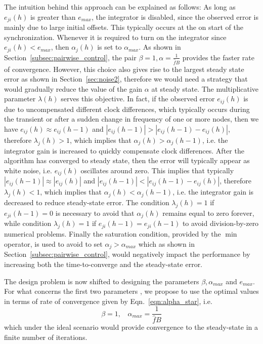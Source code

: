 \documentclass[english,a4paper,10pt,final]{article}
\numberwithin{equation}{section}
\numberwithin{figure}{section}
\begin{document}
The intuition behind this approach can be explained as follows: As long as $e_{ji}(h)$ is greater than $e_{max}$, the integrator is disabled, since the observed error is mainly due to large initial offsets. This typically occurs at the on start of the synchronization. Whenever it is required to turn on the integrator since $e_{ji}(h)<e_{max}$, then $\alpha_j(h)$ is set to $\alpha_{max}$. As shown in Section~\ref{subsec:pairwise_control}, the pair $\beta=1, \alpha=\frac{1}{\hat f B}$ provides the faster rate of convergence. However, this choice also gives rise to the largest steady state error as shown in Section~\ref{sec:noise2}, therefore we would need a strategy that would gradually reduce the value of the gain $\alpha$ at steady state. The multiplicative parameter $\lambda(h)$ serves this objective. In fact, if the observed error $e_{ij}(h)$ is due to uncompensated different clock differences, which typically occurs during the transient or after a sudden change in frequency of one or more nodes, then we have $ e_{ij}(h)\approx e_{ij}(h-1)$ and $|e_{ij}(h-1)|> |e_{ij}(h-1)-e_{ij}(h)|$, therefore $\lambda_j(h)>1$, which implies that $\alpha_j(h)>\alpha_j(h-1)$, i.e. the integrator gain is increased to quickly compensate clock differences. After the algorithm has converged to steady state, then the error will typically appear as white noise, i.e. $ e_{ij}(h)$ oscillates around zero. This implies that typically $|e_{ij}(h-1)|\approx |e_{ij}(h)|$ and $|e_{ij}(h-1)|< |e_{ij}(h-1)-e_{ij}(h)|$, therefore $\lambda_j(h)<1$, which implies that $\alpha_j(h)<\alpha_j(h-1)$, i.e. the integrator gain is decreased to reduce steady-state error. The condition $\lambda_j(h)=1$ if $e_{ji}(h-1)= 0$ is necessary to avoid that $\alpha_j(h)$ remains equal to zero forever, while condition $\lambda_j(h)=1$ if $e_{ji}(h-1) = e_{ji}(h-1)$ to avoid division-by-zero numerical problems. Finally the saturation condition, provided by the $\min$ operator, is used to avoid to set $\alpha_j>\alpha_{max}$ which as shown in Section~\ref{subsec:pairwise_control}, would negatively impact the performance by increasing both the time-to-converge and the steady-state error.  




The design problem is now shifted to designing the parameters $\beta,\alpha_{max}$ and $e_{max}$. For what concerns the first two parameters , we propose to use the optimal values in terms of rate of convergence given by Eqn.~\eqref{eqn:alpha_star}, i.e.
\begin{equation}\label{eqn:alpha_star_global}
\beta=1, \ \  \ \ \alpha_{max}=  \frac{1}{\hat f B}
\end{equation} which under the ideal scenario would provide convergence to the steady-state in a finite number of iterations. 
\end{document}
